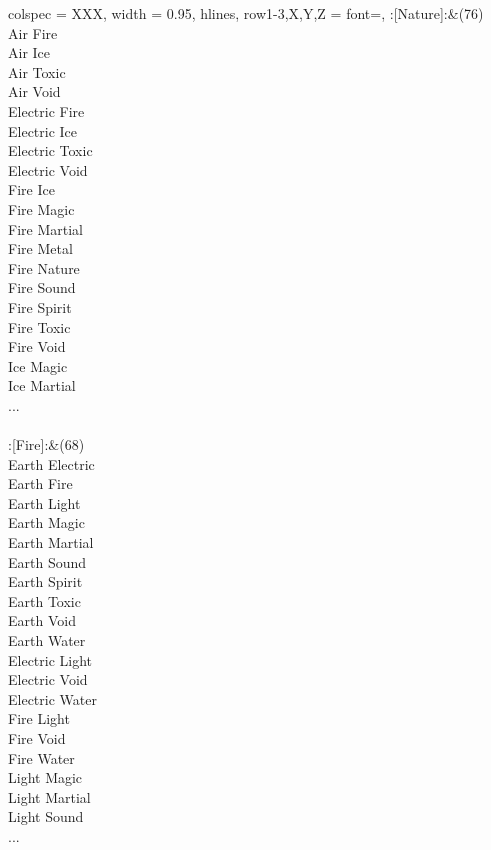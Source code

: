 \begin{longtblr}[
	caption = {1v2 Attacking Ineffective},
	label = {1v2-Attacking-Ineffective},
]{
	colspec = {XXX}, width = 0.95\linewidth,
	hlines,
	row{1-3,X,Y,Z} = {font=\bfseries},
}
	:[Nature]:&{(76)\\
	Air Fire \\
	Air Ice \\
	Air Toxic \\
	Air Void \\
	Electric Fire \\
	Electric Ice \\
	Electric Toxic \\
	Electric Void \\
	Fire Ice \\
	Fire Magic \\
	Fire Martial \\
	Fire Metal \\
	Fire Nature \\
	Fire Sound \\
	Fire Spirit \\
	Fire Toxic \\
	Fire Void \\
	Ice Magic \\
	Ice Martial \\
	...\\
	}\\

	:[Fire]:&{(68)\\
	Earth Electric \\
	Earth Fire \\
	Earth Light \\
	Earth Magic \\
	Earth Martial \\
	Earth Sound \\
	Earth Spirit \\
	Earth Toxic \\
	Earth Void \\
	Earth Water \\
	Electric Light \\
	Electric Void \\
	Electric Water \\
	Fire Light \\
	Fire Void \\
	Fire Water \\
	Light Magic \\
	Light Martial \\
	Light Sound \\
	...\\
	}\\


\end{longtblr}
